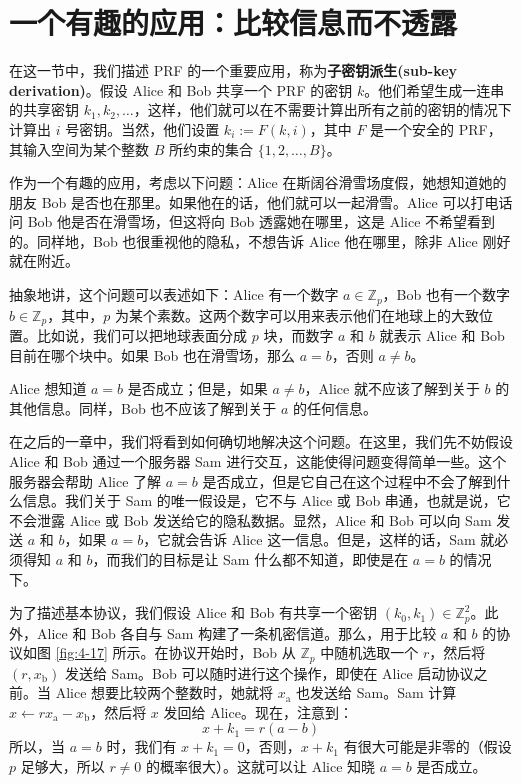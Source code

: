 \section{一个有趣的应用：比较信息而不透露}

在这一节中，我们描述 PRF 的一个重要应用，称为\textbf{子密钥派生(sub-key derivation)}。假设 Alice 和 Bob 共享一个 PRF 的密钥 $k$。他们希望生成一连串的共享密钥 $k_1,k_2,\dots$，这样，他们就可以在不需要计算出所有之前的密钥的情况下计算出 $i$ 号密钥。当然，他们设置 $k_i:=F(k,i)$，其中 $F$ 是一个安全的 PRF，其输入空间为某个整数 $B$ 所约束的集合 $\{1,2,\dots,B\}$。

作为一个有趣的应用，考虑以下问题：Alice 在斯阔谷滑雪场度假，她想知道她的朋友 Bob 是否也在那里。如果他在的话，他们就可以一起滑雪。Alice 可以打电话问 Bob 他是否在滑雪场，但这将向 Bob 透露她在哪里，这是 Alice 不希望看到的。同样地，Bob 也很重视他的隐私，不想告诉 Alice 他在哪里，除非 Alice 刚好就在附近。

抽象地讲，这个问题可以表述如下：Alice 有一个数字 $a\in\mathbb{Z}_p$，Bob 也有一个数字 $b\in\mathbb{Z}_p$，其中，$p$ 为某个素数。这两个数字可以用来表示他们在地球上的大致位置。比如说，我们可以把地球表面分成 $p$ 块，而数字 $a$ 和 $b$ 就表示 Alice 和 Bob 目前在哪个块中。如果 Bob 也在滑雪场，那么 $a=b$，否则 $a\neq b$。

Alice 想知道 $a=b$ 是否成立；但是，如果 $a\neq b$，Alice 就不应该了解到关于 $b$ 的其他信息。同样，Bob 也不应该了解到关于 $a$ 的任何信息。

在之后的一章中，我们将看到如何确切地解决这个问题。在这里，我们先不妨假设 Alice 和 Bob 通过一个服务器 Sam 进行交互，这能使得问题变得简单一些。这个服务器会帮助 Alice 了解 $a=b$ 是否成立，但是它自己在这个过程中不会了解到什么信息。我们关于 Sam 的唯一假设是，它不与 Alice 或 Bob 串通，也就是说，它不会泄露 Alice 或 Bob 发送给它的隐私数据。显然，Alice 和 Bob 可以向 Sam 发送 $a$ 和 $b$，如果 $a=b$，它就会告诉 Alice 这一信息。但是，这样的话，Sam 就必须得知 $a$ 和 $b$，而我们的目标是让 Sam 什么都不知道，即使是在 $a=b$ 的情况下。

为了描述基本协议，我们假设 Alice 和 Bob 有共享一个密钥 $(k_0,k_1)\in\mathbb{Z}_p^2$。此外，Alice 和 Bob 各自与 Sam 构建了一条机密信道。那么，用于比较 $a$ 和 $b$ 的协议如图 \ref{fig:4-17} 所示。在协议开始时，Bob 从 $\mathbb{Z}_p$ 中随机选取一个 $r$，然后将 $(r,x_\mathrm{b})$ 发送给 Sam。Bob 可以随时进行这个操作，即使在 Alice 启动协议之前。当 Alice 想要比较两个整数时，她就将 $x_\mathrm{a}$ 也发送给 Sam。Sam 计算 $x\leftarrow rx_\mathrm{a}-x_\mathrm{b}$，然后将 $x$ 发回给 Alice。现在，注意到：
\[
x+k_1=r(a-b)
\]
所以，当 $a=b$ 时，我们有 $x+k_1=0$，否则，$x+k_1$ 有很大可能是非零的（假设 $p$ 足够大，所以 $r\neq0$ 的概率很大）。这就可以让 Alice 知晓 $a=b$ 是否成立。

